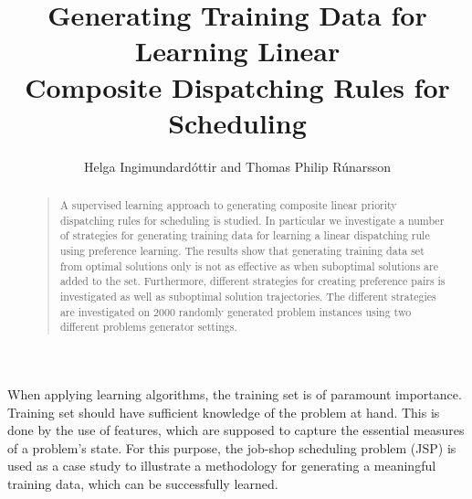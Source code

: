 \documentclass[smallextended]{llncs}
\begin{document}
\title{Generating Training Data for Learning Linear \\ Composite Dispatching Rules for Scheduling}
\author{Helga Ingimundard\'ottir and Thomas Philip R\'unarsson}

\maketitle
\begin{abstract}
\begin{quote}
A supervised learning approach to generating composite linear priority dispatching rules for scheduling is studied. In particular we investigate a number of strategies for generating training data for learning a linear dispatching rule using preference learning. The results show that generating training data set from optimal solutions only is not as effective as when suboptimal solutions are added to the set. Furthermore, different strategies for creating preference pairs is investigated as well as suboptimal solution trajectories. The different strategies are investigated on 2000 randomly generated problem instances using two different problems generator settings.
\end{quote}
\end{abstract}

\noindent When applying learning algorithms, the training set is of paramount importance. Training set should have sufficient knowledge of the problem at hand. This is done by the use of features, which are supposed to capture the essential measures of a problem's state. For this purpose, the job-shop scheduling problem (JSP) is used as a case study to illustrate a methodology for generating a meaningful training data, which can be successfully learned. 
\end{document}
